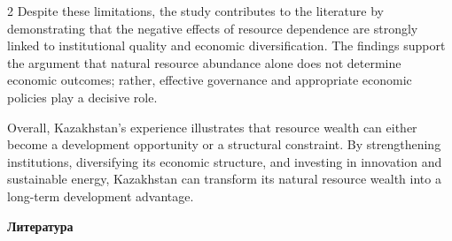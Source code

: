 \begin{multicols}{2}
Despite these limitations, the study contributes to the literature by
demonstrating that the negative effects of resource dependence are
strongly linked to institutional quality and economic diversification.
The findings support the argument that natural resource abundance alone
does not determine economic outcomes; rather, effective governance and
appropriate economic policies play a decisive role.

Overall, Kazakhstan's experience illustrates that resource wealth can
either become a development opportunity or a structural constraint. By
strengthening institutions, diversifying its economic structure, and
investing in innovation and sustainable energy, Kazakhstan can transform
its natural resource wealth into a long-term development advantage.
\end{multicols}

\begin{center}
{\bfseries Литература}
\end{center}

